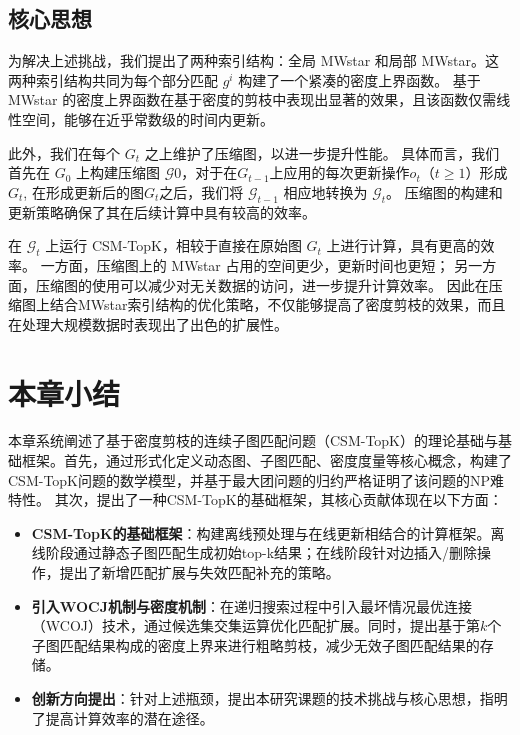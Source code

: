 \subsection{核心思想}
为解决上述挑战，我们提出了两种索引结构：全局 MWstar 和局部 MWstar。这两种索引结构共同为每个部分匹配 $g^i$ 构建了一个紧凑的密度上界函数。
基于 MWstar 的密度上界函数在基于密度的剪枝中表现出显著的效果，且该函数仅需线性空间，能够在近乎常数级的时间内更新。

此外，我们在每个 $G_t$ 之上维护了压缩图，以进一步提升性能。
具体而言，我们首先在 $G_0$ 上构建压缩图 $\mathcal{G}0$，对于在$G_{t-1}$上应用的每次更新操作$o_t$（$t \geq 1$）形成$G_t$,
在形成更新后的图$G_t$之后，我们将 $\mathcal{G}_{t-1}$ 相应地转换为 $\mathcal{G}_t$。
压缩图的构建和更新策略确保了其在后续计算中具有较高的效率。

在 $\mathcal{G}_t$ 上运行 CSM-TopK，相较于直接在原始图 $G_t$ 上进行计算，具有更高的效率。
一方面，压缩图上的 MWstar 占用的空间更少，更新时间也更短；
另一方面，压缩图的使用可以减少对无关数据的访问，进一步提升计算效率。
因此在压缩图上结合MWstar索引结构的优化策略，不仅能够提高了密度剪枝的效果，而且在处理大规模数据时表现出了出色的扩展性。
\section{本章小结}
本章系统阐述了基于密度剪枝的连续子图匹配问题（CSM-TopK）的理论基础与基础框架。首先，通过形式化定义动态图、子图匹配、密度度量等核心概念，构建了CSM-TopK问题的数学模型，并基于最大团问题的归约严格证明了该问题的NP难特性。
其次，提出了一种CSM-TopK的基础框架，其核心贡献体现在以下方面：
\begin{itemize}
\item \textbf{CSM-TopK的基础框架}：构建离线预处理与在线更新相结合的计算框架。离线阶段通过静态子图匹配生成初始top-k结果；在线阶段针对边插入/删除操作，提出了新增匹配扩展与失效匹配补充的策略。

\item \textbf{引入WOCJ机制与密度机制}：在递归搜索过程中引入最坏情况最优连接（WCOJ）技术，通过候选集交集运算优化匹配扩展。同时，提出基于第$k$个子图匹配结果构成的密度上界来进行粗略剪枝，减少无效子图匹配结果的存储。

\item \textbf{创新方向提出}：针对上述瓶颈，提出本研究课题的技术挑战与核心思想，指明了提高计算效率的潜在途径。
\end{itemize}    
